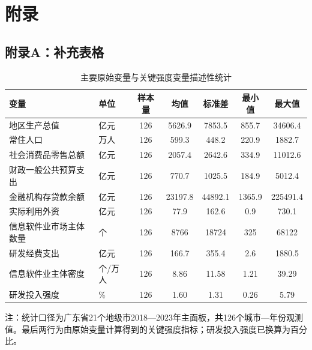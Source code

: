 \documentclass[12pt, a4paper]{ctexart}
\newcommand{\compacttableformat}{\footnotesize\setlength{\tabcolsep}{3pt}\renewcommand{\arraystretch}{1.15}}
\begin{document}
\newpage
{}
{}



\newpage
\appendix
\renewcommand{\appendixname}{附录}
\section*{附录}
{}

\subsection*{附录A：补充表格}
\begin{table}[htbp]
\centering
\begin{threeparttable}
\caption{主要原始变量与关键强度变量描述性统计}
\label{tab:raw-desc-stat}
{\compacttableformat
\begin{tabular}{p{3.35cm}p{1.35cm}ccccc}
\toprule
变量 & 单位 & 样本量 & 均值 & 标准差 & 最小值 & 最大值 \\
\midrule
地区生产总值 & 亿元 & 126 & 5626.9 & 7853.5 & 855.7 & 34606.4 \\
常住人口 & 万人 & 126 & 599.3 & 448.2 & 220.9 & 1882.7 \\
社会消费品零售总额 & 亿元 & 126 & 2057.4 & 2642.6 & 334.9 & 11012.6 \\
财政一般公共预算支出 & 亿元 & 126 & 770.7 & 1025.5 & 184.9 & 5012.4 \\
金融机构存贷款余额 & 亿元 & 126 & 23197.8 & 44892.1 & 1365.9 & 225491.4 \\
实际利用外资 & 亿元 & 126 & 77.9 & 162.6 & 0.9 & 730.1 \\
信息软件业市场主体数量 & 个 & 126 & 8766 & 18724 & 325 & 68122 \\
研发经费支出 & 亿元 & 126 & 166.7 & 355.4 & 2.6 & 1880.5 \\
信息软件业主体密度 & 个/万人 & 126 & 8.86 & 11.58 & 1.21 & 39.29 \\
研发投入强度 & \% & 126 & 1.60 & 1.31 & 0.26 & 5.79 \\
\bottomrule
\end{tabular}
}
\begin{tablenotes}
\footnotesize
\item 注：统计口径为广东省21个地级市2018—2023年主面板，共126个城市—年份观测值。最后两行为由原始变量计算得到的关键强度指标；研发投入强度已换算为百分比。
\end{tablenotes}
\end{threeparttable}
\end{table}
\end{document}
